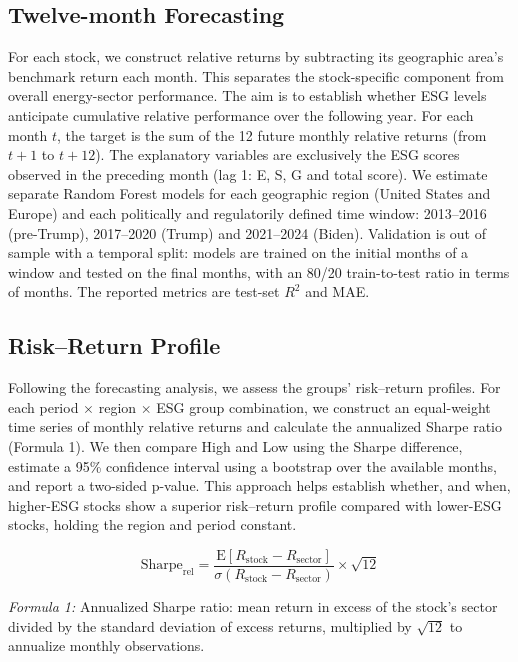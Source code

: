 \documentclass[12pt,a4paper]{article}
\begin{document}
\subsection{Twelve-month Forecasting}

For each stock, we construct relative returns by subtracting its geographic area's benchmark return each month. This separates the stock-specific component from overall energy-sector performance. The aim is to establish whether ESG levels anticipate cumulative relative performance over the following year. For each month $t$, the target is the sum of the 12 future monthly relative returns (from $t+1$ to $t+12$). The explanatory variables are exclusively the ESG scores observed in the preceding month (lag 1: E, S, G and total score). We estimate separate Random Forest models for each geographic region (United States and Europe) and each politically and regulatorily defined time window: 2013--2016 (pre-Trump), 2017--2020 (Trump) and 2021--2024 (Biden). Validation is out of sample with a temporal split: models are trained on the initial months of a window and tested on the final months, with an 80/20 train-to-test ratio in terms of months. The reported metrics are test-set $R^2$ and MAE.

\subsection{Risk--Return Profile}

Following the forecasting analysis, we assess the groups' risk--return profiles. For each period $\times$ region $\times$ ESG group combination, we construct an equal-weight time series of monthly relative returns and calculate the annualized Sharpe ratio (Formula 1). We then compare High and Low using the Sharpe difference, estimate a 95\% confidence interval using a bootstrap over the available months, and report a two-sided p-value. This approach helps establish whether, and when, higher-ESG stocks show a superior risk--return profile compared with lower-ESG stocks, holding the region and period constant.

\[
\mathrm{Sharpe}_{\mathrm{rel}} =
\frac{\mathrm{E}[R_{\mathrm{stock}} - R_{\mathrm{sector}}]}{\sigma(R_{\mathrm{stock}} - R_{\mathrm{sector}})}\times\sqrt{12}
\]

\noindent\textit{Formula 1:} Annualized Sharpe ratio: mean return in excess of the stock's sector divided by the standard deviation of excess returns, multiplied by $\sqrt{12}$ to annualize monthly observations.
\end{document}
